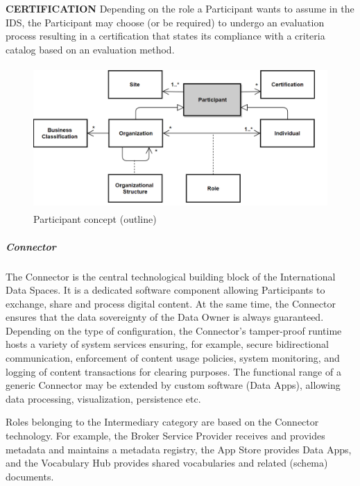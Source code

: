 \textbf{CERTIFICATION} Depending on the role a Participant wants to assume in the IDS, the Participant may choose (or be required) to undergo an evaluation process resulting in a certification that states its compliance with a criteria catalog based on an evaluation method.




\begin{figure}[H]
	\begin{Center}
		\includegraphics[width=4.68in,height=2.15in]{./media/image49.png}
		\caption{Participant concept (outline)}
		\label{fig:Participant_concept_outline}
	\end{Center}
\end{figure}



\subparagraph*{Connector}
The Connector is the central technological building block of the International Data Spaces. It is a dedicated software component allowing Participants to exchange, share and process digital content. At the same time, the Connector ensures that the data sovereignty of the Data Owner is always guaranteed. Depending on the type of configuration, the Connector’s tamper-proof runtime hosts a variety of system services ensuring, for example, secure bidirectional communication, enforcement of content usage policies, system monitoring, and logging of content transactions for clearing purposes. The functional range of a generic Connector may be extended by custom software (Data Apps), allowing data processing, visualization, persistence etc. 

Roles belonging to the Intermediary category are based on the Connector technology. For example, the Broker Service Provider receives and provides metadata and maintains a metadata registry, the App Store provides Data Apps, and the Vocabulary Hub provides shared vocabularies and related (schema) documents. 

